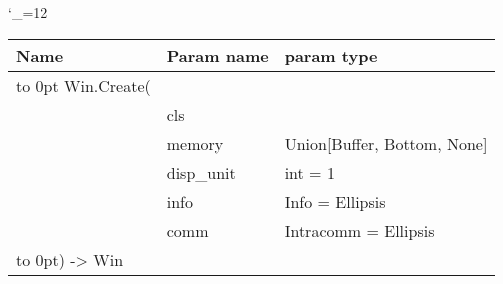 \begingroup \catcode`\_=12 \tt
\begin{tabular}{lll}
\toprule
\textrm{Name}&\textrm{Param name}&\textrm{param type}\\
\midrule
\hbox to 0pt {Win.Create(\hss}\\
& cls\\
& memory & Union[Buffer, Bottom, None]\\
& disp_unit & int = 1\\
& info & Info = Ellipsis\\
& comm & Intracomm = Ellipsis\\
\hbox to 0pt{) -> Win\hss}\\
\bottomrule
\end{tabular}
\endgroup
